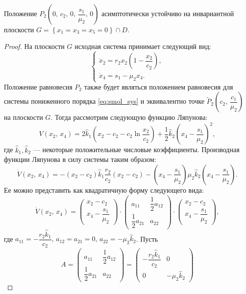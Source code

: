 \documentclass[14pt,a4paper]{extarticle}
\begin{document}
	\begin{theorem}
		Положение $P_2\left(0,\, c_2,\,0,\,\dfrac{s_1}{\mu_2},\, 0\right)$ асимптотически устойчиво на инвариантной плоскости $G=\left\{x_1=x_3=x_5=0\right\}\cap D$. 
	\end{theorem}
	\begin{proof}
		На плоскости $G$ исходная система принимает следующий вид:
		\begin{equation}\label{eq:smol_sys}
			\begin{cases}
				\dot{x}_2=r_2x_2\left(1-\dfrac{x_2}{c_2}\right),\\
				\dot{x}_4=s_1-\mu_2x_4.
			\end{cases}
		\end{equation}
		Положение равновесия $P_2$ также будет являться положением равновесия для системы пониженного порядка \ref{eq:smol_sys} и эквивалентно точке $\tilde{P}_2\left(c_2,\, \dfrac{c_1}{\mu_2}\right)$ на плоскости $G$. Тогда рассмотрим следующую функцию Ляпунова:
		\[V(x_2,\, x_4)=2\hat{k}_1\left(x_2-c_2-c_2\ln\dfrac{x_2}{c_2}\right)+\dfrac{1}{2}\hat{k}_2\left(x_4-\dfrac{s_1}{\mu_2}\right)^2,\]
		где $\hat{k}_1,\hat{k}_2$ --- некоторые положительные числовые коэффициенты. Производная функции Ляпунова в силу системы таким образом:
		\[\dot{V}(x_2,\,x_4)=-(x_2-c_2)\hat{k}_1\dfrac{r_2}{c_2}(x_2-c_2)-\left(x_4-\dfrac{s_1}{\mu_2}\right)\mu_2\hat{k}_2\left(x_4-\dfrac{s_1}{\mu_2}\right).\]
		Ее можно представить как квадратичную форму следующего вида:
		\[\dot{V}(x_2,\, x_4)=\begin{pmatrix}
			x_2-c_2\\
			x_4-\dfrac{s_1}{\mu_2}
		\end{pmatrix}\cdot\begin{pmatrix}
			a_{11} & \dfrac{1}{2}a_{12}\\
			\dfrac{1}{2}a_{21} & a_{22}
		\end{pmatrix}\cdot\begin{pmatrix}
			x_2-c_2\\
			x_4-\dfrac{s_1}{\mu_2}
		\end{pmatrix},\]
		где $a_{11}=-\dfrac{r_2\hat{k}_1}{c_2},\, a_{12}=a_{21}=0,\, a_{22}=-\mu_2\hat{k}_2$. Пусть
		\[A=\begin{pmatrix}
			a_{11} & \dfrac{1}{2}a_{12}\\
			\dfrac{1}{2}a_{21} & a_{22}
		\end{pmatrix}=\begin{pmatrix}
		-\dfrac{r_2\hat{k}_1}{c_2} & 0\\
		0 & -\mu_2\hat{k}_2

\end{pmatrix}\]
\end{proof}
\end{document}
